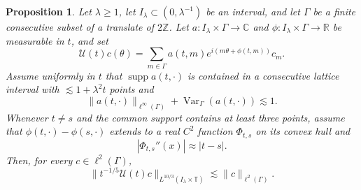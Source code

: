 \documentclass[10pt,a4paper]{amsart}
\newtheorem{proposition}[theorem]{Proposition}
\numberwithin{equation}{section}
\newcommand{\T}{\mathbb T}
\newcommand{\norm}[1]{\lVert #1\rVert}
\begin{document}
\begin{proposition}\label{prop:weighted-sum}
Let \(\lambda\ge1\), let \(I_\lambda\subset(0,\lambda^{-1})\) be an interval,
and let \(\Gamma\) be a finite consecutive subset of a translate of
\(2\mathbb Z\). Let
\(a:I_\lambda\times\Gamma\to\mathbb C\) and
\(\phi:I_\lambda\times\Gamma\to\mathbb R\) be measurable in \(t\), and set
\[
 \mathcal U(t)c(\theta)
 =\sum_{m\in\Gamma}a(t,m)e^{i(m\theta+\phi(t,m))}c_m.
\]
Assume uniformly in \(t\) that \(\operatorname{supp}a(t,\cdot)\) is contained
in a consecutive lattice interval with \(\lesssim1+\lambda^2t\) points and
\[
 \norm{a(t,\cdot)}_{\ell^\infty(\Gamma)}
 +\operatorname{Var}_\Gamma(a(t,\cdot))\lesssim1.
\]
Whenever \(t\ne s\) and the common support contains at least three points,
assume that \(\phi(t,\cdot)-\phi(s,\cdot)\) extends to a real \(C^2\) function
\(\Phi_{t,s}\) on its convex hull and
\[
 |\Phi_{t,s}''(x)|\approx|t-s|.
\]
Then, for every \(c\in\ell^2(\Gamma)\),
\begin{equation}\label{eq:weighted-sum-bound}
 \norm{t^{-1/5}\mathcal U(t)c}_{L^{10/3}(I_\lambda\times\T)}
 \lesssim\norm c_{\ell^2(\Gamma)}.
\end{equation}
\end{proposition}
\end{document}
